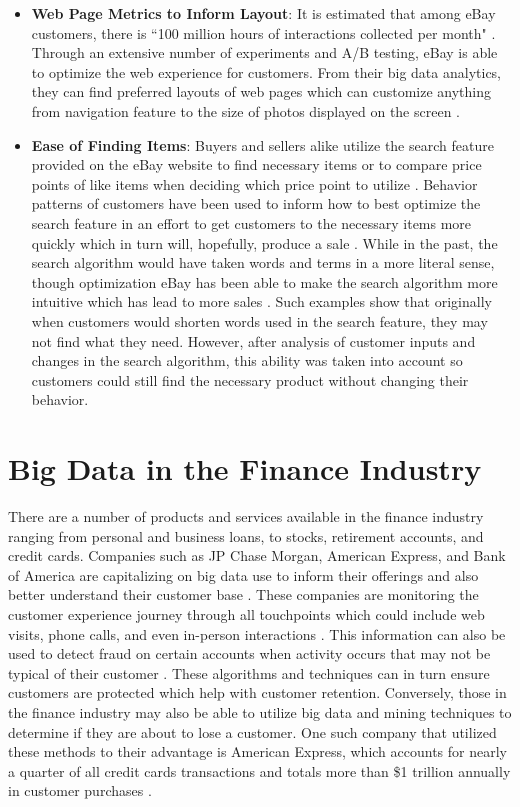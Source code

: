 \documentclass[sigconf]{acmart}
\begin{document}
 \begin{itemize}
 \item \textbf{Web Page Metrics to Inform Layout}: It is estimated that among eBay customers, there is ``100 million hours of interactions collected per month" \cite{Sararn2014}. Through an extensive number of experiments and A/B testing, eBay is able to optimize the web experience for customers. From their big data analytics, they can find preferred layouts of web pages which can customize anything from navigation feature to the size of photos displayed on the screen \cite{Akter2016}.   
 
 \item \textbf{Ease of Finding Items}: Buyers and sellers alike utilize the search feature provided on the eBay website to find necessary items or to compare price points of like items when deciding which price point to utilize \cite{Lui2012}. Behavior patterns of customers have been used to inform how to best optimize the search feature in an effort to get customers to the necessary items more quickly which in turn will, hopefully, produce a sale \cite{Lui2012}. While in the past, the search algorithm would have taken words and terms in a more literal sense, though optimization eBay has been able to make the search algorithm more intuitive which has lead to more sales \cite{Lui2012}. Such examples show that originally when customers would shorten words used in the search feature, they may not find what they need. However, after analysis of customer inputs and changes in the search algorithm, this ability was taken into account so customers could still find the necessary product without changing their behavior. 
 
 \end{itemize}
 
\section{Big Data in the Finance Industry}
There are a number of products and services available in the finance industry ranging from personal and business loans, to stocks, retirement accounts, and credit cards. Companies such as JP Chase Morgan, American Express, and Bank of America are capitalizing on big data use to inform their offerings and also better understand their customer base \cite{Woodie2016}. These companies are monitoring the customer experience journey through all touchpoints which could include web visits, phone calls, and even in-person interactions \cite{Groenfeldt2012}. This information can also be used to detect fraud on certain accounts when activity occurs that may not be typical of their customer \cite{Woodie2016}. These algorithms and techniques can in turn ensure customers are protected which help with customer retention. Conversely, those in the finance industry may also be able to utilize big data and mining techniques to determine if they are about to lose a customer. One such company that utilized these methods to their advantage is American Express, which accounts for nearly a quarter of all credit cards transactions and totals more than \$1 trillion annually in customer purchases \cite{Morgan2014}. 
\end{document}
